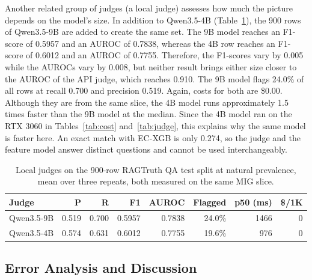 \documentclass[a4paper,fleqn]{cas-sc}
\begin{document}
Another related group of judges (a local judge) assesses how much the picture depends on the model's size. In addition to Qwen3.5-4B (Table~\ref{tab:judge9b}), the 900 rows of Qwen3.5-9B are added to create the same set. The 9B model reaches an F1-score of 0.5957 and an AUROC of 0.7838, whereas the 4B row reaches an F1-score of 0.6012 and an AUROC of 0.7755. Therefore, the F1-scores vary by 0.005 while the AUROCs vary by 0.008, but neither result brings either size closer to the AUROC of the API judge, which reaches 0.910. The 9B model flags 24.0\% of all rows at recall 0.700 and precision 0.519. Again, costs for both are \$0.00. Although they are from the same slice, the 4B model runs approximately 1.5 times faster than the 9B model at the median. Since the 4B model ran on the RTX 3060 in Tables~\ref{tab:cost} and~\ref{tab:judge}, this explains why the same model is faster here. An exact match with EC-XGB is only 0.274, so the judge and the feature model answer distinct questions and cannot be used interchangeably.

\begin{table}[pos=htbp]
  \centering
  \caption{Local judges on the 900-row RAGTruth QA test split at natural prevalence, mean over three repeats, both measured on the same MIG slice.}
  \label{tab:judge9b}
  \begin{tabular}{lrrrrrrr}
    \toprule
    \textbf{Judge} & \textbf{P} & \textbf{R} & \textbf{F1} & \textbf{AUROC} & \textbf{Flagged} & \textbf{p50 (ms)} & \textbf{\$/1K} \\
    \midrule
    Qwen3.5-9B     & 0.519      & 0.700      & 0.5957      & 0.7838         & 24.0\%           & 1466              & 0              \\
    Qwen3.5-4B     & 0.574      & 0.631      & 0.6012      & 0.7755         & 19.6\%           & 976               & 0              \\
    \bottomrule
  \end{tabular}
\end{table}

\subsection{Error Analysis and Discussion}
\end{document}
